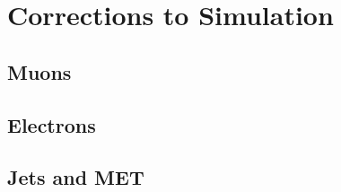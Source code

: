 \section{Corrections to Simulation}

\subsection{Muons}

\subsection{Electrons}

\subsection{Jets and MET}
